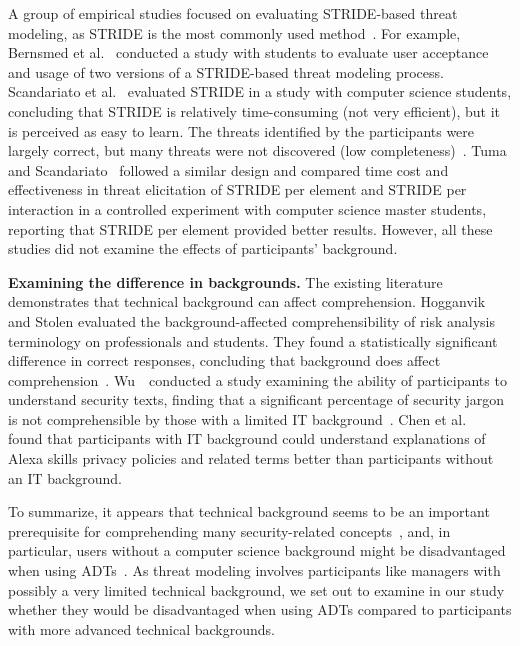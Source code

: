 A group of empirical studies focused on evaluating STRIDE-based threat modeling, as STRIDE is the most commonly used method~\cite{verreydt2024threat,thompson2024there,jamil2021threat}. For example, Bernsmed et al.~\cite{bernsmed2022adopting} conducted a study with students to evaluate user acceptance and usage of two versions of a STRIDE-based threat modeling process. Scandariato et al.~\cite{scandariato2015descriptive} evaluated STRIDE in a study with computer science students, concluding that STRIDE is relatively time-consuming (not very efficient), but it is perceived as easy to learn. The threats identified by the participants were largely correct, but many threats were not discovered (low completeness)~\cite{scandariato2015descriptive}. Tuma and Scandariato~\cite{tuma2018two} followed a similar design and compared time cost and effectiveness in threat elicitation of STRIDE per element and STRIDE per interaction in a controlled experiment with computer science master students, reporting that STRIDE per element provided better results. However, all these studies did not examine the effects of participants' background.   


\textbf{Examining the difference in backgrounds.}
The existing literature demonstrates that technical background can affect comprehension. Hogganvik and Stolen evaluated the background-affected comprehensibility of risk analysis terminology on professionals and students. They found a statistically significant difference in correct responses, concluding that background does affect comprehension~\cite{hogganvik_risk_2005}. Wu~\etal\ conducted a study examining the ability of participants to understand security texts, finding that a significant percentage of security jargon is not comprehensible by those with a limited IT background~\cite{wu_what_2020}. Chen et al.~\cite{chen2023investigating} found that participants with IT background could understand explanations of Alexa skills privacy policies and related terms better than participants without an IT background. 


To summarize, it appears that technical background seems to be an important prerequisite for comprehending many security-related concepts~\cite{lallieEmpiricalEvaluationEffectiveness2017,hogganvik_risk_2005,wu_what_2020}, and, in particular, users without a computer science background might be disadvantaged when using ADTs~\cite{lallieEmpiricalEvaluationEffectiveness2017}. As threat modeling involves participants like managers with possibly a very limited technical background, we set out to examine in our study whether they would be disadvantaged when using ADTs compared to participants with more advanced technical backgrounds.

